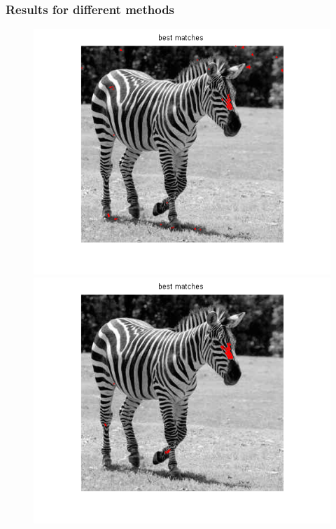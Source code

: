 \documentclass[compress]{beamer} %
\begin{document}
\begin{frame}
\frametitle{Results for different methods}
\begin{figure}
\centering
\begin{minipage}{0.3\linewidth}
\includegraphics[width=1.3\linewidth]{zebra_best_matches_euclidian.png}
\end{minipage}
\begin{minipage}{0.3\linewidth}
\includegraphics[width=1.3\linewidth]{zebra_best_matches_similarity.png}
\end{minipage}
\begin{minipage}{0.3\linewidth}

\end{minipage}
\end{figure}
\end{frame}
\end{document}
